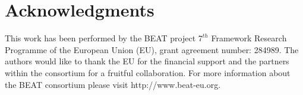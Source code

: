 \documentclass[journal]{IEEEtran}
\begin{document}
\section{Acknowledgments}

This work has been performed by the BEAT project $7^{th}$ Framework Research Programme of the European Union (EU), grant agreement number: 284989. The authors would like to thank the EU for the financial support and the partners within the consortium for a fruitful collaboration. For more information about the BEAT consortium please visit http://www.beat-eu.org.



\end{document}
